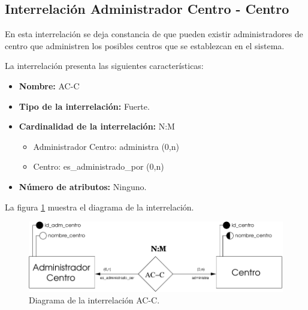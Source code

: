 \subsection{Interrelación Administrador Centro - Centro}

   \begin{description}
      \item[Definición] En esta interrelación se deja constancia de que pueden
      existir administradores de centro que administren los posibles centros
      que se establezcan en el sistema.

      \item[Características] La interrelación presenta las siguientes
                             características:

         \begin{itemize}
            \item \textbf{Nombre:} AC-C
            \item \textbf{Tipo de la interrelación:} Fuerte.
            \item \textbf{Cardinalidad de la interrelación:} N:M
                  \begin{itemize}
                     \item Administrador Centro: administra (0,n)
                     \item Centro: es\_administrado\_por (0,n)
                  \end{itemize}
            \item \textbf{Número de atributos:} Ninguno.
         \end{itemize}

      \item[Diagrama] La figura \ref{diagramaAC-C} muestra el diagrama de la
                      interrelación.
      \item \begin{figure}[!ht]
            \begin{center}
            \includegraphics[]{07.Modelo_Entidad-Interrelacion/7.3.Analisis_Interrelaciones/diagramas/AC-C.pdf}
            \caption{Diagrama de la interrelación AC-C.}
            \label{diagramaAC-C}
            \end{center}
         \end{figure}


\end{description}
